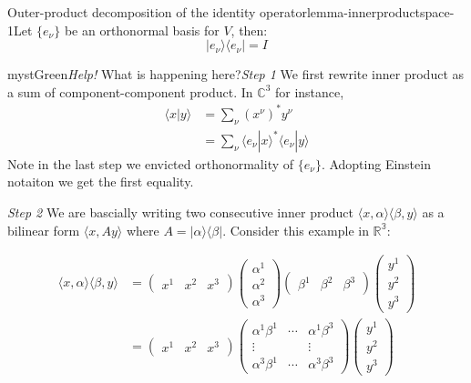 \begin{mystthmlemma}{Outer-product decomposition of the identity operator}{lemma-innerproductspace-1}Let $\{e_{\nu}\}$ be an orthonormal basis for $V$, then:
\begin{equation}
|e_{\nu} \rangle \langle e_{\nu}|=I
\end{equation}

\end{mystthmlemma}
\begin{mystadmonition}{mystGreen}{\emph{Help!} What is happening here?}\textit{Step 1} We first rewrite inner product as a sum of component-component product. In $\mathbb{C}^3$ for instance,
\begin{equation}
\begin{aligned}
\langle x | y\rangle &= \sum_{\nu} (x^{\nu})^* y^{\nu} \\
&= \sum_{\nu} \langle e_{\nu} | x \rangle^*  \langle e_{\nu} | y \rangle
\end{aligned}
\end{equation}
Note in the last step we envicted orthonormality of $\{e_\nu\}$. Adopting Einstein notaiton we get the first equality.

\textit{Step 2} We are bascially writing two consecutive inner product $\langle x, \alpha \rangle \langle \beta, y \rangle$ as a bilinear form $\langle x, A y\rangle$ where $A=| \alpha \rangle \langle \beta |$. Consider this example in $\mathbb{R^3}$:

\begin{equation}
\begin{aligned}
\langle x, \alpha \rangle \langle \beta, y \rangle &=
\begin{pmatrix}
x^1 & x^2 & x^3
\end{pmatrix}
\begin{pmatrix}
\alpha^1 \\ \alpha^2 \\ \alpha^3
\end{pmatrix}
\begin{pmatrix}
\beta^1 & \beta^2 & \beta^3
\end{pmatrix}
\begin{pmatrix}
y^1 \\ y^2 \\ y^3
\end{pmatrix} \\
&= 
\begin{pmatrix}
x^1 & x^2 & x^3
\end{pmatrix}
\begin{pmatrix}
\alpha^1 \beta^1 & \cdots & \alpha^1\beta^3 \\
\vdots & & \vdots \\
\alpha^3 \beta^1 & \cdots & \alpha^3\beta^3
\end{pmatrix}
\begin{pmatrix}
y^1 \\ y^2 \\ y^3
\end{pmatrix} \\
\end{aligned}
\end{equation}


\end{mystadmonition}

